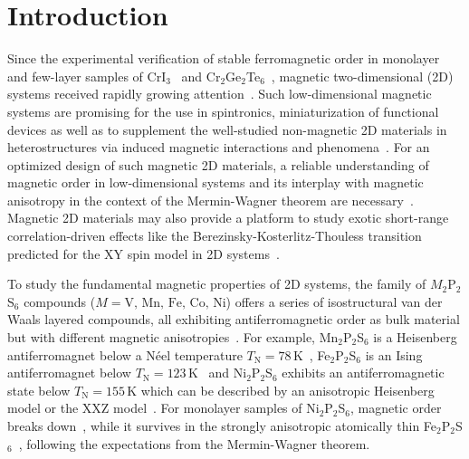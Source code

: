 \documentclass[twocolumn,superscriptaddress,prb,preprintnumbers,nobibnotes,aps]{revtex4-2}  %
\begin{document}

\maketitle

\section{Introduction}

Since the experimental verification of stable ferromagnetic order in monolayer and few-layer samples of CrI$_3$~\cite{Huang2017} and Cr$_2$Ge$_2$Te$_6$~\cite{CGong2017}, magnetic two-dimensional (2D) systems received rapidly growing attention~\cite{NatNano2018}. Such low-dimensional magnetic systems are promising for the use in spintronics, miniaturization of functional devices as well as to supplement the well-studied non-magnetic 2D materials in heterostructures via induced magnetic interactions and phenomena~\cite{Wang2018,Gibertini2019,Zhong2017,Song2019,Wang2018a,Samarth2017}. For an optimized design of such magnetic 2D materials, a reliable understanding of magnetic order in low-dimensional systems and its interplay with magnetic anisotropy in the context of the Mermin-Wagner theorem are necessary~\cite{Mermin1966}. Magnetic 2D materials may also provide a platform to study exotic short-range correlation-driven effects like the Berezinsky-Kosterlitz-Thouless transition predicted for the XY spin model in 2D systems~\cite{Kosterlitz1973,Berezinsky1970}.

To study the fundamental magnetic properties of 2D systems, the family of $M_2$P$_2$S$_6$ compounds ($M = \textrm{V, Mn, Fe, Co, Ni}$) offers a series of isostructural van der Waals layered compounds, all exhibiting antiferromagnetic order as bulk material but with different magnetic anisotropies~\cite{Brec1986}. For example, Mn$_2$P$_2$S$_6$ is a Heisenberg antiferromagnet below a N\'{e}el temperature $T_\textrm{N} = 78$\,K~\cite{PJoy1992,Wildes1998}, Fe$_2$P$_2$S$_6$ is an Ising antiferromagnet below $T_\textrm{N} = 123$\,K~\cite{PJoy1992,DLancon2016} and Ni$_2$P$_2$S$_6$ exhibits an antiferromagnetic state below $T_\textrm{N} = 155$\,K which can be described by an anisotropic Heisenberg model or the XXZ model~\cite{PJoy1992,Lancon2018,Kim2019}. For monolayer samples of Ni$_2$P$_2$S$_6$, magnetic order breaks down~\cite{Kim2019}, while it survives in the strongly anisotropic atomically thin Fe$_2$P$_2$S$_6$~\cite{Lee2016}, following the expectations from the Mermin-Wagner theorem.
\end{document}
